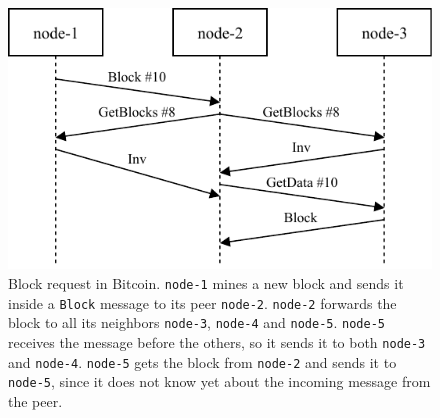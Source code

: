 \begin{figure}[ht]
	\centering
	\vspace*{0.4cm}
	\includegraphics[scale=1.04]{figures/block_download}
	\vspace*{0.25cm}
	\caption[Block request in Bitcoin]{
		Block request in Bitcoin.
		\texttt{node-1} mines a new block and sends it inside a \texttt{Block} message to its peer \texttt{node-2}.
		\texttt{node-2} forwards the block to all its neighbors \texttt{node-3}, \texttt{node-4} and \texttt{node-5}.
		\texttt{node-5} receives the message before the others, so it sends it to both \texttt{node-3} and \texttt{node-4}.
		\texttt{node-5} gets the block from \texttt{node-2} and sends it to \texttt{node-5}, since it does not know yet about the incoming message from the peer.
	}
	\label{fig:block-download}
\end{figure}

